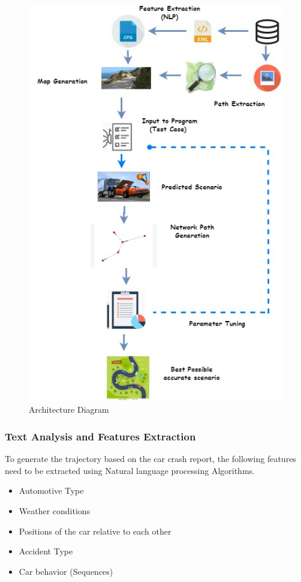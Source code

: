 \begin{figure}[H]
\centering
  \includegraphics[scale=0.55]{pictures/Architecture_Diagram_Proposal_AT.jpg}
  \caption{Architecture Diagram}
\end{figure}

\subsubsection{Text Analysis and Features Extraction}
To generate the trajectory based on the car crash report, the following features need to be extracted using Natural language processing Algorithms. 

\begin{itemize}
  \item	Automotive Type
  \item	Weather conditions
  \item	Positions of the car relative to each other
  \item	Accident Type
  \item	Car behavior (Sequences)

\end{itemize}

